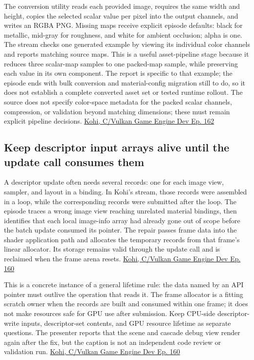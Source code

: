The conversion utility reads each provided image, requires the same width and height, copies the selected scalar value per pixel into the output channels, and writes an RGBA PNG. Missing maps receive explicit episode defaults: black for metallic, mid-gray for roughness, and white for ambient occlusion; alpha is one. The stream checks one generated example by viewing its individual color channels and reports matching source maps. This is a useful asset-pipeline stage because it reduces three scalar-map samples to one packed-map sample, while preserving each value in its own component. The report is specific to that example; the episode ends with bulk conversion and material-config migration still to do, so it does not establish a complete converted asset set or tested runtime rollout. The source does not specify color-space metadata for the packed scalar channels, compression, or validation beyond matching dimensions; these must remain explicit pipeline decisions. \href{https://www.youtube.com/watch?v=C2zceJ88k7w}{Kohi, C/Vulkan Game Engine Dev Ep. 162}

\subsection{Keep descriptor input arrays alive until the update call consumes them}\label{06-engine-ii-ch026-keep-descriptor-input-arrays-alive-until-the-update-call-consumes-them}

\hypertarget{06-engine-ii-ch026-keep-descriptor-input-arrays-alive-until-the-update-call-consumes-them}{}

A descriptor update often needs several  records: one for each image view, sampler, and layout in a binding. In Kohi's stream, those records were assembled in a loop, while the corresponding  records were submitted after the loop. The episode traces a wrong image view reaching unrelated material bindings, then identifies that each local image-info array had already gone out of scope before the batch update consumed its pointer. The repair passes frame data into the shader application path and allocates the temporary records from that frame's linear allocator. Its storage remains valid through the update call and is reclaimed when the frame arena resets. \href{https://www.youtube.com/watch?v=Zcxl3BmmxJA}{Kohi, C/Vulkan Game Engine Dev Ep. 160}

This is a concrete instance of a general lifetime rule: the data named by an API pointer must outlive the operation that reads it. The frame allocator is a fitting scratch owner when the records are built and consumed within one frame; it does not make resources safe for GPU use after submission. Keep CPU-side descriptor-write inputs, descriptor-set contents, and GPU resource lifetime as separate questions. The presenter reports that the scene and cascade debug view render again after the fix, but the caption is not an independent code review or validation run. \href{https://www.youtube.com/watch?v=Zcxl3BmmxJA}{Kohi, C/Vulkan Game Engine Dev Ep. 160}

